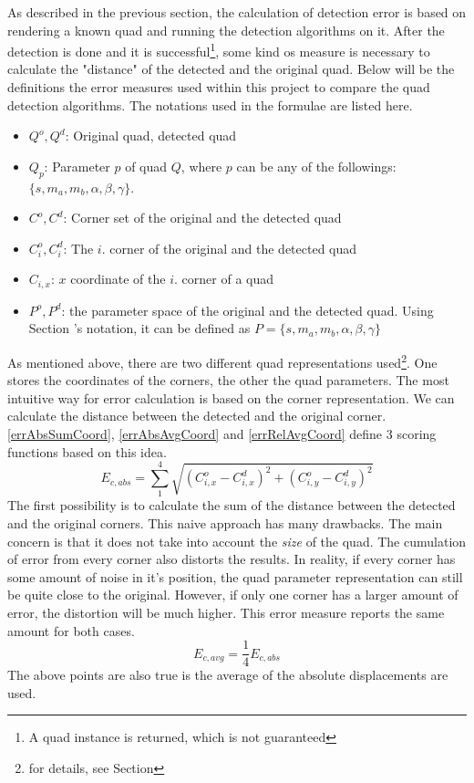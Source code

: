 As described in the previous section, the calculation of detection error is based on rendering a known quad and running the detection algorithms on it.
After the detection is done and it is successful\footnote{A quad instance is returned, which is not guaranteed}, some kind os measure is necessary to calculate the "distance" of the detected and the original quad.
Below will be the definitions the error measures used within this project to compare the quad detection algorithms.
The notations used in the formulae are listed here.
\begin{itemize}
	\item $Q^o, Q^d$: Original quad, detected quad
	\item $Q_p$: Parameter $p$ of quad $Q$, where $p$ can be any of the followings: $\{s, m_a, m_b, \alpha, \beta, \gamma\}$. 
	\item $C^o, C^d$: Corner set of the original and the detected quad
	\item $C_i^o, C_i^d$: The $i.$ corner of the original and the detected quad
	\item $C_{i,x}$: $x$ coordinate of the $i.$ corner of a quad
	\item $P^o, P^d$: the parameter space of the original and the detected quad. Using Section 's notation, it can be defined as $P = \{s, m_a, m_b, \alpha, \beta, \gamma\}$
\end{itemize}

As mentioned above, there are two different quad representations used\footnote{for details, see Section }.
One stores the coordinates of the corners, the other the quad parameters.
The most intuitive way for error calculation is based on the corner representation.
We can calculate the distance between the detected and the original corner.
\eqref{errAbsSumCoord}, \eqref{errAbsAvgCoord} and \eqref{errRelAvgCoord} define 3 scoring functions based on this idea. 
\begin{equation}
	E_{c,abs} = \sum_{1}^{4} \sqrt{(C_{i,x}^o - C_{i,x}^d)^2 + (C_{i,y}^o - C_{i,y}^d)^2}
	\label{eq:errAbsSumCoord}
\end{equation}
The first possibility is to calculate the sum of the distance between the detected and the original corners.
This naive approach has many drawbacks.
The main concern is that it does not take into account the \textit{size} of the quad.
The cumulation of error from every corner also distorts the results.
In reality, if every corner has some amount of noise in it's position, the quad parameter representation can still be quite close to the original.
However, if only one corner has a larger amount of error, the distortion will be much higher.
This error measure reports the same amount for both cases.
\begin{equation}
	E_{c,avg} = \frac{1}{4} E_{c,abs}
	\label{eq:errAbsAvgCoord}
\end{equation}
The above points are also true is the average of the absolute displacements are used.

